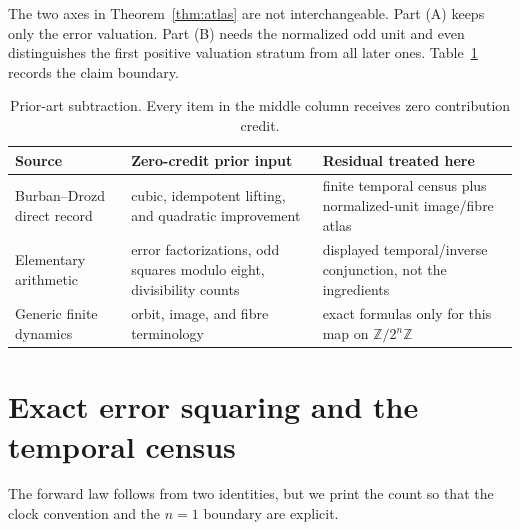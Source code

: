 \documentclass[a4paper,10pt]{amsart}
\theoremstyle{remark}
\newcommand{\Zn}{\mathbb Z/2^n\mathbb Z}
\begin{document}
The two axes in Theorem~\ref{thm:atlas} are not interchangeable.  Part (A)
keeps only the error valuation.  Part (B) needs the normalized odd unit and
even distinguishes the first positive valuation stratum from all later
ones.  Table~\ref{tab:subtraction} records the claim boundary.

\begin{table}[ht]
\centering
\small
\caption{Prior-art subtraction.  Every item in the middle column receives zero
contribution credit.}
\label{tab:subtraction}
\begin{tabular}{@{}>{\raggedright\arraybackslash}p{}
                    >{\raggedright\arraybackslash}p{}
                    >{\raggedright\arraybackslash}p{}@{}}
\toprule
Source & Zero-credit prior input & Residual treated here \\
\midrule
Burban--Drozd direct record~\cite{BurbanDrozd2004}
& cubic, idempotent lifting, and quadratic improvement
& finite temporal census plus normalized-unit image/fibre atlas \\
Elementary arithmetic
& error factorizations, odd squares modulo eight, divisibility counts
& displayed temporal/inverse conjunction, not the ingredients \\
Generic finite dynamics
& orbit, image, and fibre terminology
& exact formulas only for this map on $\Zn$ \\
\bottomrule
\end{tabular}
\end{table}

\section{Exact error squaring and the temporal census}\label{sec:time}

The forward law follows from two identities, but we print the count so that
the clock convention and the $n=1$ boundary are explicit.
\end{document}
